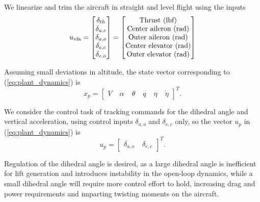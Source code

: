 We linearize and trim the aircraft in straight and level flight using the inputs
\begin{equation}
	u_{\text{vfa}} = \begin{bmatrix}
\delta_{th} \\
\delta_{a,c} \\
\delta_{a,o} \\
\delta_{e,c} \\
\delta_{e,o} 
\end{bmatrix} = \begin{bmatrix}
		$Thrust (lbf)$\\
		$Center aileron (rad)$\\
		$Outer aileron (rad)$\\
		$Center elevator (rad)$\\
		$Outer elevator (rad)$
	\end{bmatrix}
\end{equation}

Assuming small deviations in altitude, the state vector corresponding to (\ref{eq:plant_dynamics}) is
\begin{equation}
	x_p = \begin{bmatrix}
V & \; \alpha & \; \theta & \; q & \; \eta & \; \dot{\eta}
\end{bmatrix}^T.
\end{equation}

We consider the control task of tracking commands for the dihedral angle and vertical acceleration, using control inputs $\delta_{a,o}$ and $\delta_{e,c}$ only, so the vector $u_p$ in (\ref{eq:plant_dynamics}) is
\begin{equation}
	u_p = \begin{bmatrix}
\delta_{a,o} & \; \delta_{e,c}
\end{bmatrix}^T.
\end{equation}

Regulation of the dihedral angle is desired, as a large dihedral angle is inefficient for lift generation and introduces instability in the open-loop dynamics, while a small dihedral angle will require more control effort to hold, increasing drag and power requirements and imparting twisting moments on the aircraft. 

